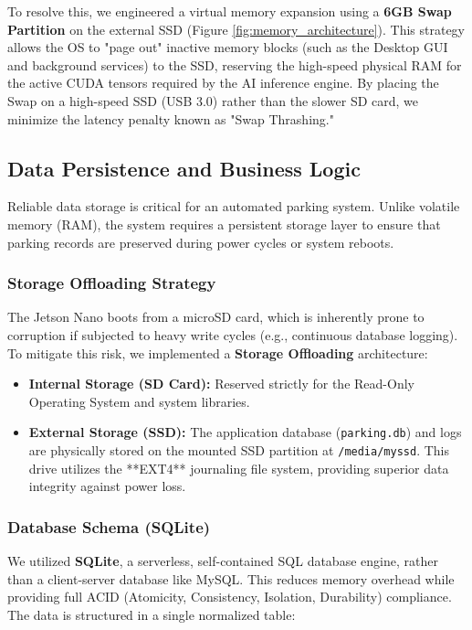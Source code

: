 To resolve this, we engineered a virtual memory expansion using a \textbf{6GB Swap Partition} on the external SSD (Figure \ref{fig:memory_architecture}). This strategy allows the OS to "page out" inactive memory blocks (such as the Desktop GUI and background services) to the SSD, reserving the high-speed physical RAM for the active CUDA tensors required by the AI inference engine. By placing the Swap on a high-speed SSD (USB 3.0) rather than the slower SD card, we minimize the latency penalty known as "Swap Thrashing."

\subsection{Data Persistence and Business Logic}

Reliable data storage is critical for an automated parking system. Unlike volatile memory (RAM), the system requires a persistent storage layer to ensure that parking records are preserved during power cycles or system reboots.

\subsubsection{Storage Offloading Strategy}
The Jetson Nano boots from a microSD card, which is inherently prone to corruption if subjected to heavy write cycles (e.g., continuous database logging). To mitigate this risk, we implemented a \textbf{Storage Offloading} architecture:
\begin{itemize}
	\item \textbf{Internal Storage (SD Card):} Reserved strictly for the Read-Only Operating System and system libraries.
	\item \textbf{External Storage (SSD):} The application database (\texttt{parking.db}) and logs are physically stored on the mounted SSD partition at \texttt{/media/myssd}. This drive utilizes the **EXT4** journaling file system, providing superior data integrity against power loss.
\end{itemize}

\subsubsection{Database Schema (SQLite)}
We utilized \textbf{SQLite}, a serverless, self-contained SQL database engine, rather than a client-server database like MySQL. This reduces memory overhead while providing full ACID (Atomicity, Consistency, Isolation, Durability) compliance. The data is structured in a single normalized table:

